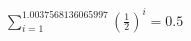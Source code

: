 \documentclass[preview]{standalone}
\begin{document}
\begin{align*}
\sum_{i=1}^{1.0037568136065997} (\frac{1}{2})^i = {0.5}
\end{align*}
\end{document}
